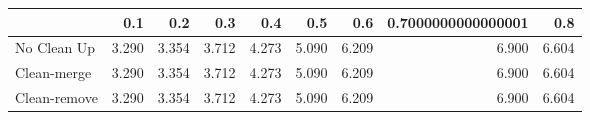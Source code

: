 \begin{tabular}{lrrrrrrrr}
\toprule
{} &   0.1 &   0.2 &   0.3 &   0.4 &   0.5 &   0.6 & 0.7000000000000001 &   0.8 \\
\midrule
No Clean Up  & 3.290 & 3.354 & 3.712 & 4.273 & 5.090 & 6.209 &              6.900 & 6.604 \\
Clean-merge  & 3.290 & 3.354 & 3.712 & 4.273 & 5.090 & 6.209 &              6.900 & 6.604 \\
Clean-remove & 3.290 & 3.354 & 3.712 & 4.273 & 5.090 & 6.209 &              6.900 & 6.604 \\
\bottomrule
\end{tabular}

